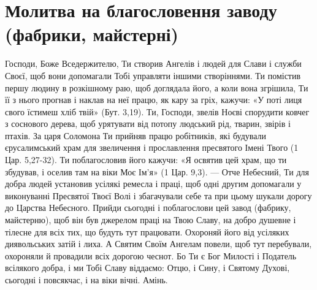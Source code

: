 \documentclass[chapters.tex]{subfiles}
\begin{document}
\section{Молитва на благословення заводу (фабрики, майстерні)}
Господи, Боже Вседержителю, Ти створив Ангелів і людей для Слави і служби Своєї, щоб вони допомагали Тобі управляти іншими створіннями. Ти помістив першу людину в розкішному раю, щоб доглядала його, а коли вона згрішила, Ти її з нього прогнав і наклав на неї працю, як кару за гріх, кажучи: «У поті лиця свого їстимеш хліб твій» (Бут. 3,19). Ти, Господи, звелів Ноєві спорудити ковчег з соснового дерева, щоб урятувати від потопу людський рід, тварин, звірів і птахів. За царя Соломона Ти прийняв працю робітників, які будували єрусалимський храм для звеличення і прославлення пресвятого Імені Твого (1 Цар. 5,27-32). Ти поблагословив його кажучи: «Я освятив цей храм, що ти збудував, і оселив там на віки Моє Ім’я» (1 Цар. 9,3). — Отче Небесний, Ти для добра людей установив усілякі ремесла і праці, щоб одні другим допомагали у виконуванні Пресвятої Твоєї Волі і збагачували себе та при цьому шукали дорогу до Царства Небесного. Прийди сьогодні і поблагослови цей завод (фабрику, майстерню), щоб він був джерелом праці на Твою Славу, на добро душевне і тілесне для всіх тих, що будуть тут працювати. Охороняй його від усіляких диявольських затій і лиха. А Святим Своїм Ангелам повели, щоб тут перебували, охороняли й провадили всіх дорогою чеснот. Бо Ти є Бог Милості і Податель всілякого добра, і ми Тобі Славу віддаємо: Отцю, і Сину, і Святому Духові, сьогодні і повсякчас, і на віки вічні. Амінь.
\end{document}
